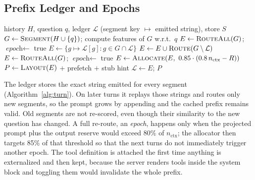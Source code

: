 \documentclass[journal]{IEEEtran}
\begin{document}
\subsection{Prefix Ledger and Epochs}
\begin{algorithm}[t]\caption{Per-turn prompt assembly with the prefix ledger}\label{alg:turn}\small
\begin{algorithmic}[1]
\Require history $H$, question $q$, ledger $\mathcal{L}$ (segment key $\mapsto$ emitted string), store $S$
\State $G\gets\textsc{Segment}(H\cup\{q\})$; compute features of $G$ w.r.t.\ $q$
 \State $E\gets\textsc{RouteAll}(G)$; $\textit{epoch}\gets$ true
\Else
  \State $E\gets\{g\mapsto\mathcal{L}[g]: g\in G\cap\mathcal{L}\}$ 
  \State $E\gets E\cup\textsc{Route}(G\setminus\mathcal{L})$
   \State $E\gets\textsc{RouteAll}(G)$; $\textit{epoch}\gets$ true \EndIf
\EndIf
{} \State $E\gets\textsc{Allocate}(E,\ 0.85\cdot(0.8\,n_\text{ctx}-R))$ \EndIf
\State $P\gets\textsc{Layout}(E)$ $+$ prefetch $+$ stub hint 
\State $\mathcal{L}\gets E$; \Return $P$
\end{algorithmic}\end{algorithm}
The ledger stores the exact string emitted for every segment (Algorithm~\ref{alg:turn}). On later turns it replays those strings
and routes only new segments, so the prompt grows by appending and the cached prefix remains valid. Old segments are not re-scored,
even though their similarity to the new question has changed. A full re-route, an \emph{epoch}, happens only when the projected
prompt plus the output reserve would exceed 80\% of $n_\text{ctx}$; the allocator then targets 85\% of that
threshold so that the next turns do not immediately trigger another epoch. The tool definition is attached the first time anything is
externalized and then kept, because the server renders tools inside the system block and toggling them would invalidate the whole
prefix.
\end{document}
